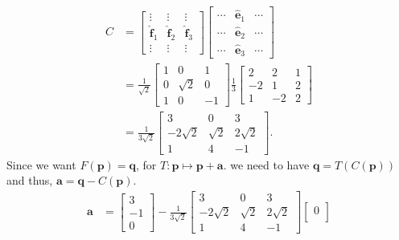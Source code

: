 \documentclass[12 pt, letterpaper]{hmcpset}
\begin{document}
\begin{solution}
	\[
		\begin{split}
			C & = \begin{bmatrix}
				\vdots & \vdots & \vdots \\
				\hat{\mathbf{f}}_{1} & \hat{\mathbf{f}}_{2} & \hat{\mathbf{f}}_{3} \\
					\vdots & \vdots & \vdots
			\end{bmatrix}
			\begin{bmatrix}
				\cdots & \hat{\mathbf{e}}_{1} & \cdots \\
				\cdots & \hat{\mathbf{e}}_{2} & \cdots \\
				\cdots & \hat{\mathbf{e}}_{3} & \cdots
			\end{bmatrix} \\
			  & = \frac{1}{\sqrt 2} \begin{bmatrix}
				  1 & 0 & 1 \\
				  0 & \sqrt 2 & 0 \\
				  1 & 0 & -1
			  \end{bmatrix} \frac{1}{3}
			  \begin{bmatrix}
				  2 & 2 & 1 \\
				  -2 & 1 & 2 \\
				  1 & -2 & 2
			  \end{bmatrix} \\
			  & = \frac{1}{3 \sqrt 2} \begin{bmatrix}
				  3 & 0 & 3 \\
				  -2 \sqrt 2 & \sqrt 2 & 2 \sqrt 2 \\
				  1 & 4 & -1
			  \end{bmatrix}.
		\end{split}
	\]
	Since we want $F(\mathbf{p}) = \mathbf{q}$, for $T : \mathbf{p} \mapsto \mathbf{p} + \mathbf{a}$. we need to have $\mathbf{q} = T(C(\mathbf{p}))$ and thus, $\mathbf{a} = \mathbf{q} - C(\mathbf{p})$.
	\[
		\begin{split}
			\mathbf{a} & = \begin{bmatrix}
				3 \\
				-1 \\
				0
			\end{bmatrix} - \frac{1}{3 \sqrt 2} \begin{bmatrix}
				  3 & 0 & 3 \\
				  -2 \sqrt 2 & \sqrt 2 & 2 \sqrt 2 \\
				  1 & 4 & -1
			  \end{bmatrix} \begin{bmatrix}
			  	0 \\

\end{bmatrix}
\end{split}\]
\end{solution}
\end{document}
